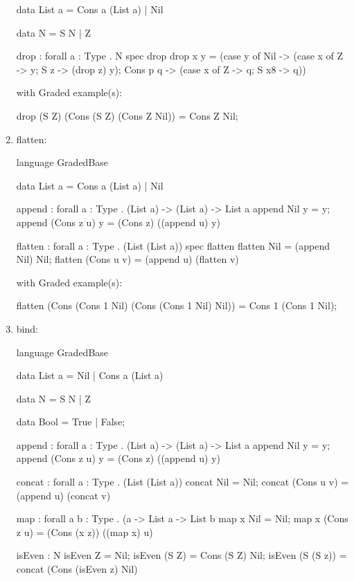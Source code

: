 \begin{enumerate}
\begin{granule}
data List a = Cons a (List a) | Nil
    
data N = S N | Z
        
drop : forall { a : Type } . N %
spec 
    drop %
drop x y = 
    (case y of
        Nil -> 
    (case x of
        Z -> y;
        S z -> (drop z) y);
        Cons p q -> 
    (case x of
        Z -> q;
        S x8 -> q))
\end{granule}
with Graded example(s): 
\begin{granule}
drop (S Z) (Cons (S Z) (Cons Z Nil)) = Cons Z Nil; 
\end{granule}
\item flatten: 
\begin{granule}
language GradedBase 

data List a = Cons a (List a) | Nil
    
append : forall { a : Type } 
       . (List a) %
       -> (List a) %
       ->  List a
append Nil y = y;
append (Cons z u) y = (Cons z) ((append u) y)
    
flatten : forall { a : Type } . (List (List a)) %
spec 
    flatten %
flatten Nil = (append Nil) Nil;
flatten (Cons u v) = (append u) (flatten v)
\end{granule}
with Graded example(s):
\begin{granule}
flatten (Cons (Cons 1 Nil) (Cons (Cons 1 Nil) Nil)) = Cons 1 (Cons 1 Nil);
\end{granule}
\item bind: 
\begin{granule}
language GradedBase

data List a = Nil | Cons a (List a) 

data N = S N | Z

data Bool = True | False; 

append : forall { a : Type } 
       . (List a) %
       -> (List a) %
       ->  List a
append Nil y = y;
append (Cons z u) y = (Cons z) ((append u) y)

concat : forall { a : Type } . (List (List a)) %
concat Nil = Nil;
concat (Cons u v) = (append u) (concat v)

map : forall { a b : Type }
    . (a %
    -> List a %
    -> List b
map x Nil = Nil;
map x (Cons z u) = (Cons (x z)) ((map x) u)

isEven : N %
isEven Z = Nil;
isEven (S Z) = Cons (S Z) Nil;
isEven (S (S z)) = concat (Cons (isEven z) Nil)


\end{granule}
\end{enumerate}
